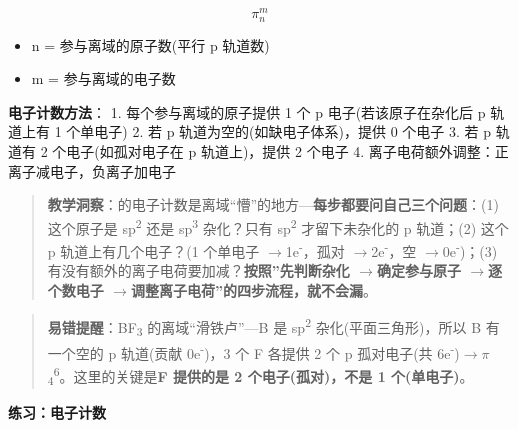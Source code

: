 \documentclass[a4paper,11pt]{ctexart}
\providecommand{\tightlist}{\setlength{\itemsep}{0pt}\setlength{\parskip}{0pt}}
\newcommand{\箭}{\ensuremath{\rightarrow}}
\newcommand{\左箭}{\ensuremath{\leftarrow}}
\newcommand{\上箭}{\ensuremath{\uparrow}}
\newcommand{\下箭}{\ensuremath{\downarrow}}
\newcommand{\衡}{\ensuremath{\rightleftharpoons}}
\newcommand{\双箭}{\ensuremath{\leftrightarrow}}
\newcommand{\约等于}{\ensuremath{\approx}}
\newcommand{\小于等于}{\ensuremath{\leq}}
\newcommand{\大于等于}{\ensuremath{\geq}}
\newcommand{\不等于}{\ensuremath{\neq}}
\newcommand{\西格马}{\ensuremath{\sigma}}
\newcommand{\派}{\ensuremath{\pi}}
\begin{document}
\[
\pi_n^m
\]

\begin{itemize}
\tightlist
\item
  n = 参与离域的原子数(平行 p 轨道数)
\item
  m = 参与离域的电子数
\end{itemize}

\textbf{电子计数方法}：
1. 每个参与离域的原子提供 1 个 p 电子(若该原子在杂化后 p 轨道上有 1 个单电子)
2. 若 p 轨道为空的(如缺电子体系)，提供 0 个电子
3. 若 p 轨道有 2 个电子(如孤对电子在 p 轨道上)，提供 2 个电子
4. 离子电荷额外调整：正离子减电子，负离子加电子

\begin{quote}
\textbf{教学洞察}： 的电子计数是离域``懵''的地方---\textbf{每步都要问自己三个问题}：(1) 这个原子是 sp\textsuperscript{2} 还是 sp\textsuperscript{3} 杂化？只有 sp\textsuperscript{2} 才留下未杂化的 p 轨道；(2) 这个 p 轨道上有几个电子？(1 个单电子 \箭 1e\textsuperscript{-}，孤对 \箭 2e\textsuperscript{-}，空 \箭 0e\textsuperscript{-})；(3) 有没有额外的离子电荷要加减？\textbf{按照''先判断杂化 \箭 确定参与原子 \箭 逐个数电子 \箭 调整离子电荷''的四步流程，就不会漏}。
\end{quote}

\begin{quote}
\textbf{易错提醒}：BF\textsubscript{3} 的离域``滑铁卢''---B 是 sp\textsuperscript{2} 杂化(平面三角形)，所以 B 有一个空的 p 轨道(贡献 0e\textsuperscript{-})，3 个 F 各提供 2 个 p 孤对电子(共 6e\textsuperscript{-})\箭 \派\textsubscript{4}\textsuperscript{6}。这里的关键是\textbf{F 提供的是 2 个电子(孤对)，不是 1 个(单电子)}。
\end{quote}

\textbf{练习： 电子计数}
\end{document}
